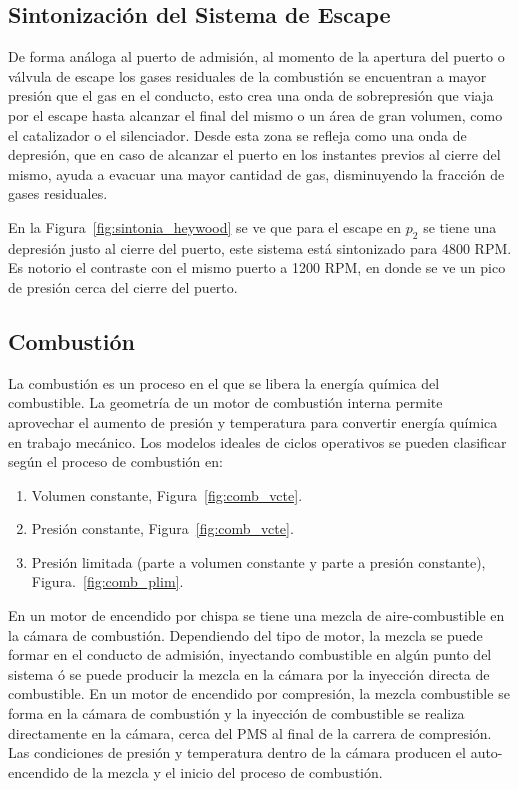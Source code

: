 \subsection{Sintonización del Sistema de Escape}

De forma análoga al puerto de admisión, al momento de la apertura del puerto o
válvula de escape los gases residuales de la combustión se encuentran a  mayor
presión que el gas en el conducto, esto crea una onda de sobrepresión que viaja
por el escape hasta alcanzar el final del mismo o un área de gran volumen, como
el catalizador o el silenciador.
%
Desde esta zona se refleja como una onda de depresión, que en caso de alcanzar
el puerto en los instantes previos al cierre del mismo, ayuda a evacuar una
mayor cantidad de gas, disminuyendo la fracción de gases residuales.

En la Figura~\ref{fig:sintonia_heywood} se ve que para el escape en $p_2$ se
tiene una depresión justo al cierre del puerto, este sistema está sintonizado
para 4800 RPM.
%
Es notorio el contraste con el mismo puerto a 1200 RPM, en donde se ve un pico de
presión cerca del cierre del puerto.
%

\subsection{Combustión}
%
La combustión es un proceso en el que se libera la energía química del
combustible.
%
La geometría de un motor de combustión interna permite aprovechar
el aumento de presión y temperatura para convertir energía química en trabajo
mecánico.
%
Los modelos ideales de ciclos operativos se pueden clasificar según el proceso
de combustión en:
%
\begin{enumerate}
    \item Volumen constante, Figura~\ref{fig:comb_vcte}.
    \item Presión constante, Figura~\ref{fig:comb_vcte}.
    \item Presión limitada (parte a volumen constante y parte a presión
constante), Figura.~\ref{fig:comb_plim}.
\end{enumerate}

En un motor de encendido por chispa se tiene una mezcla de aire-combustible en
la cámara de combustión.
%
Dependiendo del tipo de motor, la mezcla se puede formar en el conducto de
admisión, inyectando combustible en algún punto del sistema ó se puede producir
la mezcla en la cámara por la inyección directa de combustible.
%
En un motor de encendido por compresión, la mezcla combustible se forma en la
cámara de combustión y la inyección de combustible se realiza directamente en la
cámara, cerca del PMS al final de la carrera de compresión.
%
Las condiciones de presión y temperatura dentro de la cámara producen el
auto-encendido de la mezcla y el inicio del proceso de combustión.

